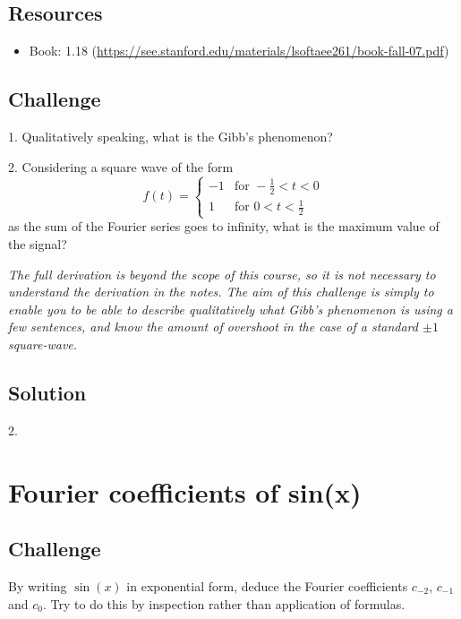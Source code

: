 \subsection*{Resources}
\begin{itemize}
    \item Book: 1.18 (\url{https://see.stanford.edu/materials/lsoftaee261/book-fall-07.pdf})
\end{itemize}

\subsection*{Challenge}
1. Qualitatively speaking, what is the Gibb's phenomenon?

2. Considering a square wave of the form
\begin{equation}
    f(t)=
    \begin{cases}
        -1 & \text{for } -\frac{1}{2} < t < 0 \\
        1 & \text{for } 0 < t < \frac{1}{2}
    \end{cases}
\end{equation}
as the sum of the Fourier series goes to infinity, what is the maximum value of the signal?

\emph{The full derivation is beyond the scope of this course, so it is not necessary to understand the derivation in the notes. The aim of this challenge is simply to enable you to be able to describe qualitatively what Gibb's phenomenon is using a few sentences, and know the amount of overshoot in the case of a standard $\pm 1$ square-wave.}

\subsection*{Solution}
2.\\




\newpage
\section{Fourier coefficients of sin(x)}
\label{sec:fcsinx}

\subsection*{Challenge}
By writing $\sin(x)$ in exponential form, deduce the Fourier coefficients $c_{-2}$, $c_{-1}$ and $c_0$. Try to do this by inspection rather than application of formulas.

